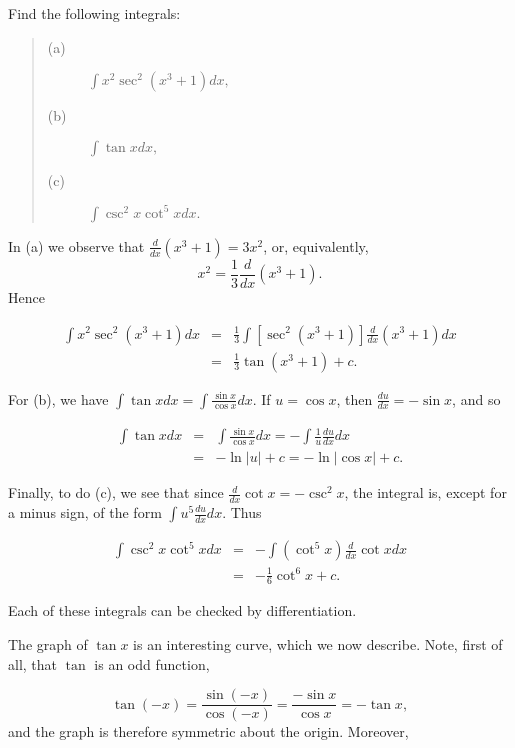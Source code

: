 \begin{example} Find the following integrals:


\begin{quote}
\begin{description}
\item[(a)] $\int x^{2} \sec^{2} (x^{3} + 1 ) dx,$
\item[(b)] $\int \tan x dx,$
\item[(c)] $\int \csc^{2}x \cot^{5}x dx.$
\end{description}
\end{quote}
\noindent In (a) we observe that $\frac{d}{dx}(x^{3} + 1) = 3x^{2}$, or, equivalently,
$$
x^2 = \frac{1}{3} \frac{d}{dx} (x^{3} + 1).
$$
\noindent Hence


\begin{eqnarray*}
\int x^{2} \sec^{2}(x^{3} + 1) dx &=& \frac{1}{3} \int [\sec^{2} (x^{3} + 1)] \frac{d}{dx} (x^{3} + 1)dx\\
&=& \frac{1}{3} \tan (x^{3}+ 1) + c.
\end{eqnarray*}

\noindent For (b), we have $\int \tan x dx = \int \frac{\sin x}{\cos x} dx$. If $u = \cos x$, then 
$\frac{du}{dx} = -\sin x$, and so


\begin{eqnarray*}
\int \tan x dx &=& \int  \frac{\sin x}{\cos x} dx = - \int \frac{1}{u} \frac{du}{dx} dx\\
                     &=& - \ln |u| + c = - \ln |\cos x| + c.
\end{eqnarray*}

\noindent Finally, to do (c), we see that since $\frac{d}{dx} \cot x = - \csc^{2}x$, the integral is, 
except for a minus sign, of the form $\int u^{5} \frac{du}{dx} dx$. Thus


\begin{eqnarray*}
\int \csc^{2} x \cot^{5}x dx &=& - \int (\cot^{5}x) \frac{d}{dx} \cot x dx\\
&=& - \frac{1}{6} \cot^{6}x + c.
\end{eqnarray*}

\noindent Each of these integrals can be checked by differentiation.
\end{example}

The graph of $\tan x$ is an interesting curve, which we now describe. Note, first of all, that $\tan$ is an odd function, 

$$
\tan(-x) = \frac{\sin(-x)}{\cos(-x)} = \frac{-\sin x}{\cos x} = - \tan x,
$$
\noindent and the graph is therefore symmetric about the origin. Moreover, 

